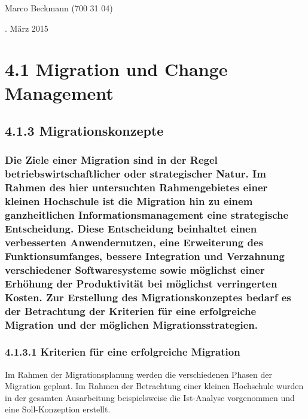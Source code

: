 \documentclass[a4paper]{article}
\begin{document}
{\centering\sffamily
Marco Beckmann (700 31 04)
\par}


\bigskip


\bigskip


\bigskip


\bigskip


\bigskip


\bigskip


\bigskip


\bigskip

{\centering{}. März 2015
\par}


\bigskip


\bigskip


\bigskip


\bigskip

\section[4.1 Migration und Change Management]{4.1 Migration und Change Management}
\subsection{4.1.3 Migrationskonzepte}
\subsubsection{Die Ziele einer Migration sind in der Regel betriebswirtschaftlicher oder strategischer Natur. Im Rahmen
des hier untersuchten Rahmengebietes einer kleinen Hochschule ist die Migration hin zu einem ganzheitlichen
Informationsmanagement eine strategische Entscheidung. Diese Entscheidung beinhaltet einen verbesserten Anwendernutzen,
eine Erweiterung des Funktionsumfanges, bessere Integration und Verzahnung verschiedener Softwaresysteme sowie
möglichst einer Erhöhung der Produktivität bei möglichst verringerten Kosten. Zur Erstellung des Migrationskonzeptes
bedarf es der Betrachtung der Kriterien für eine erfolgreiche Migration und der möglichen Migrationsstrategien.}
\subsubsection[4.1.3.1 Kriterien für eine erfolgreiche Migration]{\textbf{4.1.3.1 Kriterien für eine erfolgreiche
Migration}}

\bigskip

{\sffamily
Im Rahmen der Migrationsplanung werden die verschiedenen Phasen der Migration geplant. Im Rahmen der Betrachtung einer
kleinen Hochschule wurden in der gesamten Ausarbeitung beispielsweise die Ist-Analyse vorgenommen und eine
Soll-Konzeption erstellt.}
\end{document}
